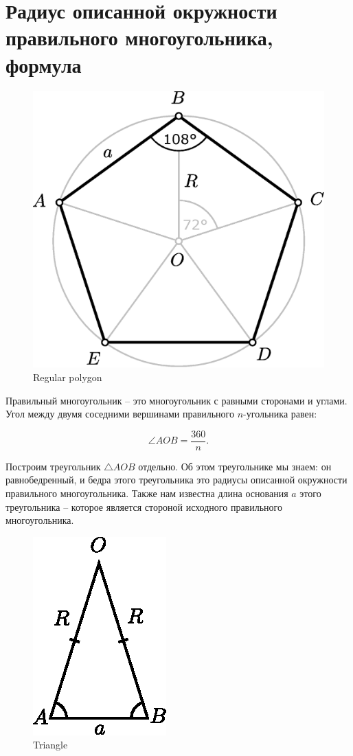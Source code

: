 \documentclass{article}
\begin{document}
\section{Радиус описанной окружности правильного многоугольника, формула}

\begin{figure}[H]
 \begin{center}
  \includegraphics[width=.4\textwidth]{regular_polygon_5_annotated.eps}
 \end{center}
 \caption{Regular polygon}
 \label{fig:regular_polygon_5_annotated}
\end{figure}
Правильный многоугольник -- это многоугольник с равными сторонами и углами. Угол 
между двумя соседними вершинами правильного $n$-угольника равен:

\begin{equation}\label{eq:angle}
  \angle AOB = \frac{360}{n}.
\end{equation}

Построим треугольник $\triangle AOB$ отдельно. Об этом треугольнике мы знаем: он 
равнобедренный, и бедра этого треугольника это радиусы описанной окружности 
правильного многоугольника. Также нам известна длина осно\-вания $a$ этого 
треугольника -- которое является стороной исходного пра\-вильного многоугольника.

\begin{figure}[H]
 \begin{center}
  \includegraphics[width=.2\textwidth]{./triangle.eps}
 \end{center}
 \caption{Triangle}
 \label{fig:triangle}
\end{figure}
\end{document}
